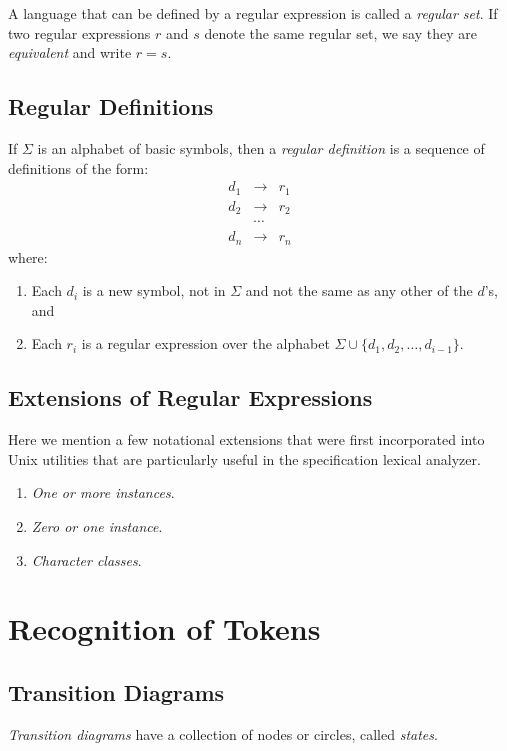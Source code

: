 \documentclass[a4paper,twoside]{book}
\begin{document}
A language that can be defined by a regular expression is called a \textit{regular set}. If two regular expressions $r$ and $s$ denote the same regular set, we say they are \textit{equivalent} and write $r=s$.

\subsection{Regular Definitions}
\label{Section:3.3.4}

If $\Sigma$ is an alphabet of basic symbols, then a \textit{regular definition} is a sequence of definitions of the form: $$\begin{array}{ccc}d_1&\to&r_1\\d_2&\to&r_2\\&\cdots\\d_n&\to&r_n\end{array}$$ where:
\begin{enumerate}
    \item Each $d_i$ is a new symbol, not in $\Sigma$ and not the same as any other of the $d$'s, and
    \item Each $r_i$ is a regular expression over the alphabet $\Sigma\cup\{d_1,d_2,\ldots,d_{i-1}\}$.
\end{enumerate}

\subsection{Extensions of Regular Expressions}

Here we mention a few notational extensions that were first incorporated into Unix utilities that are particularly useful in the specification lexical analyzer.
\begin{enumerate}
    \item\textit{One or more instances}.
    \item\textit{Zero or one instance}.
    \item\textit{Character classes}.
\end{enumerate}

\section{Recognition of Tokens}
\subsection{Transition Diagrams}

\textit{Transition diagrams} have a collection of nodes or circles, called \textit{states}.
\end{document}
